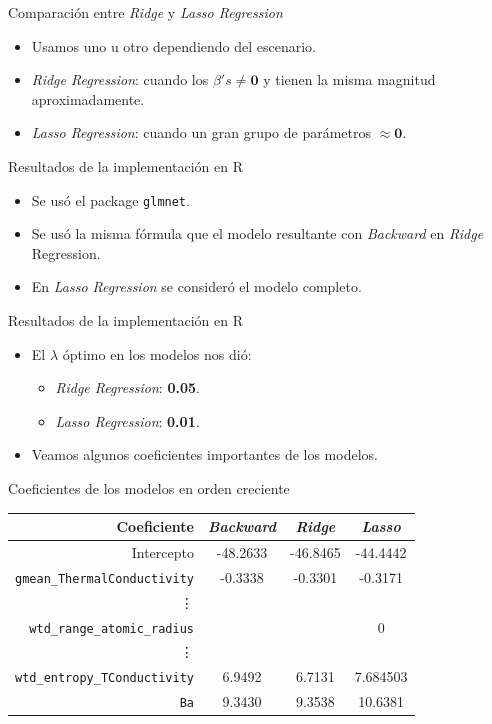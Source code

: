 \documentclass[11pt]{beamer}\usepackage{knitr}
\newcommand{\B}{\beta}
\newcommand{\cod}[1]{\texttt{\frenchspacing#1}}
\begin{document}
\begin{frame}{Comparación entre \textit{Ridge} y \textit{Lasso Regression}}
	\begin{itemize}
		\item Usamos uno u otro dependiendo del escenario.
		\pause
		\item \textit{Ridge Regression}: cuando los $\B's \not = \mathbf{0}$ y tienen la misma magnitud aproximadamente.
		\pause
		\item \textit{Lasso Regression}: cuando un gran grupo de parámetros $\approx \mathbf{0}$.
	\end{itemize}
\end{frame}

\begin{frame}{Resultados de la implementación en R}
	\begin{itemize}
		\item Se usó el package \cod{glmnet}.
		\pause
		\item Se usó la misma fórmula que el modelo resultante con \textit{Backward} en \textit{Ridge} Regression.
		\pause
		\item En \textit{Lasso Regression} se consideró el modelo completo.
	\end{itemize}
\end{frame}

\begin{frame}{Resultados de la implementación en R}
	\begin{itemize}
		\item El $\lambda$ óptimo en los modelos nos dió:
		\pause
		\begin{itemize}
			\item \textit{Ridge Regression}: \textbf{0.05}.
			\item \textit{Lasso Regression}: \textbf{0.01}.
		\end{itemize}
		\pause
		\item Veamos algunos coeficientes importantes de los modelos.
	\end{itemize}
\end{frame}


\begin{frame}{Coeficientes de los modelos en orden creciente}
	\begin{center}
		\begin{tabular}{|r|c|c|c|}
			\hline
			Coeficiente & \textit{Backward}& \textit{Ridge} & \textit{Lasso} \\
			\hline
			Intercepto  &-48.2633 &-46.8465 &-44.4442 \\
			\cod{gmean\_ThermalConductivity} & -0.3338 & -0.3301 & -0.3171 \\
			\vdots & & & \\
			\cod{wtd\_range\_atomic\_radius} &  &  & 0\\
			\vdots & & & \\
			\cod{wtd\_entropy\_TConductivity}& 6.9492 & 6.7131 & 7.684503 \\
			\cod{Ba} & 9.3430 & 9.3538 & 10.6381 \\
			\hline
		\end{tabular}
	\end{center}
\end{frame}
\end{document}
